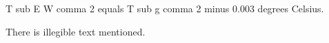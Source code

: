 T sub E W comma 2 equals T sub g comma 2 minus 0.003 degrees Celsius.

There is illegible text mentioned.